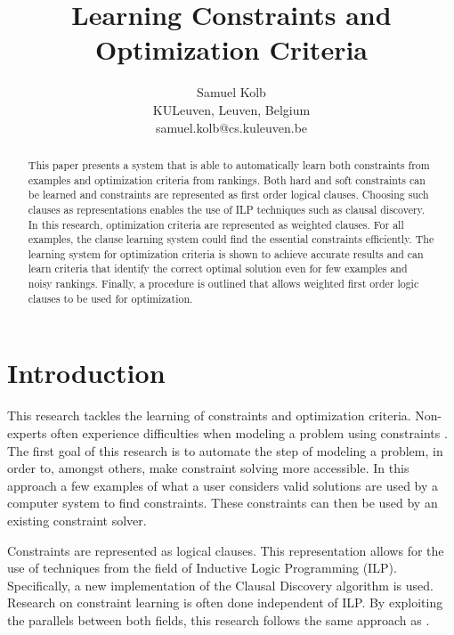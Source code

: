 \documentclass[letterpaper]{article}
\theoremstyle{definition}
\begin{document}
\title{Learning Constraints and Optimization Criteria}
\author{
  Samuel Kolb\\
  KULeuven, Leuven, Belgium\\
  samuel.kolb@cs.kuleuven.be
}

\maketitle

\begin{abstract}
This paper presents a system that is able to automatically learn both constraints from examples and optimization criteria from rankings.
Both hard and soft constraints can be learned and constraints are represented as first order logical clauses.
Choosing such clauses as representations enables the use of ILP techniques such as clausal discovery.
In this research, optimization criteria are represented as weighted clauses.
For all examples, the clause learning system could find the essential constraints efficiently.
The learning system for optimization criteria is shown to achieve accurate results and can learn criteria that identify the correct optimal solution even for few examples and noisy rankings.
Finally, a procedure is outlined that allows weighted first order logic clauses to be used for optimization.
\end{abstract}

\section{Introduction}
This research tackles the learning of constraints and optimization criteria.
Non-experts often experience difficulties when modeling a problem using constraints \cite{Wallace:PrinciplesCP}.
The first goal of this research is to automate the step of modeling a problem, in order to, amongst others, make constraint solving more accessible.
In this approach a few examples of what a user considers valid solutions are used by a computer system to find constraints.
These constraints can then be used by an existing constraint solver.

Constraints are represented as logical clauses.
This representation allows for the use of techniques from the field of Inductive Logic Programming (ILP).
Specifically, a new implementation of the Clausal Discovery algorithm \cite{DeRaedt:ClausalDiscovery} is used.
Research on constraint learning is often done independent of ILP.
By exploiting the parallels between both fields, this research follows the same approach as \cite{Lallouet:LearningCP}.
\end{document}

